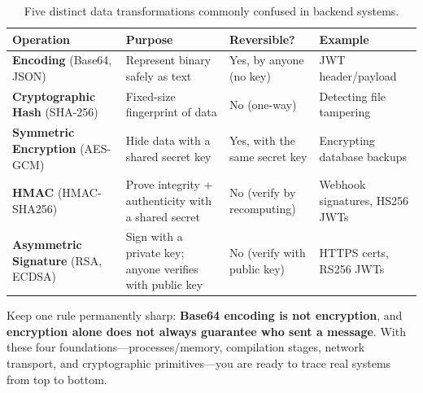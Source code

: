 \begin{table}[htbp]
\centering\small
\begin{tabular}{p{3.0cm}p{3.4cm}p{3.2cm}p{4.0cm}}
\toprule
\textbf{Operation} & \textbf{Purpose} & \textbf{Reversible?} & \textbf{Example} \\
\midrule
\textbf{Encoding} (Base64, JSON) & Represent binary safely as text & Yes, by anyone (no key) & JWT header/payload \\
\textbf{Cryptographic Hash} (SHA-256) & Fixed-size fingerprint of data & No (one-way) & Detecting file tampering \\
\textbf{Symmetric Encryption} (AES-GCM) & Hide data with a shared secret key & Yes, with the same secret key & Encrypting database backups \\
\textbf{HMAC} (HMAC-SHA256) & Prove integrity + authenticity with a shared secret & No (verify by recomputing) & Webhook signatures, HS256 JWTs \\
\textbf{Asymmetric Signature} (RSA, ECDSA) & Sign with a private key; anyone verifies with public key & No (verify with public key) & HTTPS certs, RS256 JWTs \\
\bottomrule
\end{tabular}
\caption{Five distinct data transformations commonly confused in backend systems.}
\label{tab:primer-crypto}
\end{table}

Keep one rule permanently sharp: \textbf{Base64 encoding is not encryption}, and \textbf{encryption alone does not always guarantee who sent a message}. With these four foundations---processes/memory, compilation stages, network transport, and cryptographic primitives---you are ready to trace real systems from top to bottom.
